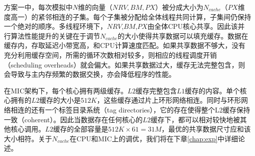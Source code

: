 方案一中，每次模拟中$N$维的向量（$NRV, BM, PX$）被分成大小为$N_{cache}$（$PX$维度高一）的紧邻相连的子集。每个子集被分配给全体线程共同计算，子集间仍保持一个绝对的顺序。多线程环境下，$NRV$,$BM$,$PX$由全体CPU核心共享。因此该并行算法性能提升的关键在于调节$N_{cache}$的大小使得共享数据可以填充缓存。数据在缓存内，存取延迟小带宽高，和CPU计算速度匹配。如果共享数据不够大，没有充分利用缓存空间，所需的循环次数相对较多，则相应的线程调度开销（scheduling overheads）就会偏大。如果共享数据过大，缓存无法完整包含，则会导致与主内存频繁的数据交换，亦会降低程序的性能。

在MIC架构下，每个核心拥有两级缓存。$L2$缓存完整包含$L1$缓存的内容。单个核心拥有的$L2$缓存的大小是$512K$，这些缓存通过片上环形网络相连。同时与环形网络相连的还有一个标签目录系统（tag directories），它的存在使得整个L2缓存保持一致（coherent）。因此当数据存在任何核心的$L2$缓存下，都可以相对较快地被其他核心调用。$L2$缓存的全部容量是$512K\times 61 = 31M$，最优的共享数据尺寸应和该大小相符。关于$N_{cache}$在CPU和MIC上的调优，我们将在下章\ref{chap:exp}中详细论述。

